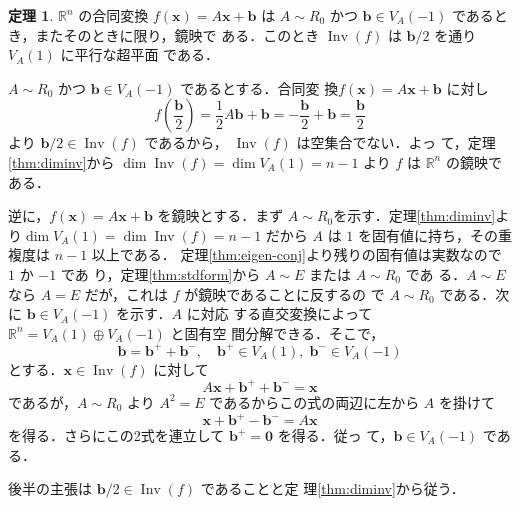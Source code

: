\documentclass[11pt, uplatex, dvipdfmx, titlepage]{jsarticle}
\makeatletter
\DeclareMathOperator{\Inv}{Inv}
\renewenvironment{proof}[1][\proofname]{\par
  \pushQED{\qed}%
  \normalfont \topsep6\p@\@plus6\p@\relax
  \trivlist
  \item[\hskip\labelsep
         \bfseries
    {#1}]\ignorespaces
}{%
  \popQED\endtrivlist\@endpefalse
}
\theoremstyle{definition}
\newtheorem{theorem}{定理}[section]
\renewcommand{\proofname}{\textbf{証明}}
\makeatother
\begin{document}
\begin{theorem}\label{thm:refconcrete}
  $\mathbb{R}^n$ の合同変換 $f(\bm{x}) = A\bm{x} + \bm{b}$ は $A \sim
  R_0$ かつ $\bm{b} \in V_A(-1)$ であるとき，またそのときに限り，鏡映で
  ある．このとき $\Inv(f)$ は $\bm{b}/2$ を通り $V_A(1)$ に平行な超平面
  である．
\end{theorem}

\begin{proof}
  $A\sim R_0$ かつ $\bm{b} \in V_A(-1)$ であるとする．合同変
  換$f(\bm{x}) = A \bm{x} + \bm{b}$ に対し
  \[
    f\left( \frac{\bm{b}}{2}\right) = \frac{1}{2} A \bm{b} + \bm{b} 
    =-\frac{\bm{b}}{2} + \bm{b} =\frac{\bm{b}}{2} 
  \]
  より $\bm{b}/2 \in \Inv(f)$ であるから， $\Inv(f)$ は空集合でない．よっ
  て，定理\ref{thm:diminv}から $\dim \Inv(f) = \dim V_A(1) =
  n-1$ より $f$ は $\mathbb{R}^n$ の鏡映である．

  逆に，$f(\bm{x}) = A\bm{x} + \bm{b}$ を鏡映とする．まず
  $A \sim
  R_0$を示す．定理\ref{thm:diminv}より$\dim V_A(1) = \dim \Inv(f) =
  n-1$ だから $A$ は $1$ を固有値に持ち，その重複度は $n-1$ 以上である．
  定理\ref{thm:eigen-conj}より残りの固有値は実数なので $1$ か $-1$ であ
  り，定理\ref{thm:stdform}から $A \sim E$ または $A \sim R_0$ であ
  る．$A \sim E$ なら $A=E$ だが，これは $f$ が鏡映であることに反するの
  で $A \sim R_0$ である．次に $\bm{b} \in V_A(-1)$ を示す．$A$ に対応
  する直交変換によって $\mathbb{R}^n = V_A(1) \oplus V_A(-1)$ と固有空
  間分解できる．そこで，
  \[
    \bm{b} = \bm{b}^{+} + \bm{b}^{-}, \quad \bm{b}^{+} \in V_A(1), \; \bm{b}^{-} \in V_A(-1)
  \]
  とする．$\bm{x} \in \Inv(f)$ に対して
  \[
    A\bm{x} + \bm{b}^{+} + \bm{b}^{-} = \bm{x}
  \]
  であるが，$A \sim R_0$ より $A^2 = E$ であるからこの式の両辺に左から $A$ を掛けて
  \[
    \bm{x} + \bm{b}^{+} -\bm{b}^{-} = A\bm{x}
  \]
  を得る．さらにこの2式を連立して $\bm{b}^{+} = \bm{0}$ を得る．従っ
  て，$\bm{b} \in V_A(-1)$ である．

  後半の主張は $\bm{b}/2 \in \Inv(f)$ であることと定
  理\ref{thm:diminv}から従う．
\end{proof}


\end{document}
